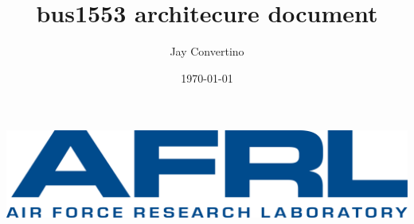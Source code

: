 \documentclass{article}
\title{bus1553 architecure document}
\author{Jay Convertino}
\date{\today}
\begin{document}
  \begin{titlepage}
    \begin{center}

    \thetitle

    \theauthor

    \thedate

    \includegraphics[width=\textwidth,height=\textheight,keepaspectratio]{src/img/01_AFRL Logo_BLUE_secondary.png}

    \end{center}
  \end{titlepage}
\end{document}
